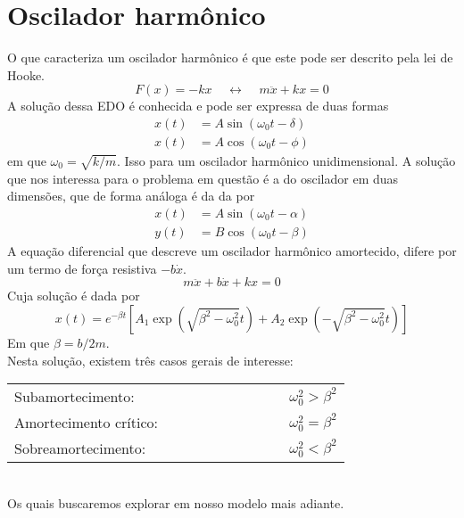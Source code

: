 \documentclass[12pt]{article}
\begin{document}
    \section*{Oscilador harmônico}
    O que caracteriza um oscilador harmônico é que este pode ser descrito pela lei de Hooke.
    \begin{equation*}
        F(x) = -kx\;\;\;\;\leftrightarrow\;\;\;\;m\ddot{x} + kx=0
    \end{equation*}
    A solução dessa EDO é conhecida e pode ser expressa de duas formas
    \begin{equation*}
        \begin{aligned}
            x(t)&=A\sin(\omega_0t-\delta)\\
            x(t)&=A\cos(\omega_0t-\phi)
        \end{aligned}
    \end{equation*}
    em que $\omega_0=\sqrt{k/m}$. Isso para um oscilador harmônico unidimensional. A solução que nos interessa
    para o problema em questão é a do oscilador em duas dimensões, que de forma análoga é da da por
    \begin{equation*}
        \begin{aligned}
            x(t)&=A\sin(\omega_0t-\alpha)\\
            y(t)&=B\cos(\omega_0t-\beta)
        \end{aligned}
    \end{equation*}
    A equação diferencial que descreve um oscilador harmônico amortecido, difere por um termo de força resistiva
    $-b\dot{x}$.
    \begin{equation*}
            m\ddot{x}+b\dot{x}+kx=0
    \end{equation*}
    Cuja solução é dada por
    \begin{equation*}
        x(t)=e^{-\beta t}\left[A_1\exp\left(\sqrt{\beta^2-\omega_0^2}t\right)+A_2\exp\left(-\sqrt{\beta^2-\omega_0^2}t\right)\right]
    \end{equation*}
    Em que $\beta=b/2m$.
    \\Nesta solução, existem três casos gerais de interesse:
    \begin{table}[h]
        \begin{tabular}{llc}
        Subamortecimento:      & $\;\;\;\;\;\;\;\;\;\;\;\;\;\;\;\;\;\;\;\;\;\;\;\;\;\;$ & $\omega_0^2>\beta^2$ \\
        Amortecimento crítico: & $\;\;\;\;\;\;\;\;\;\;\;\;\;\;\;\;\;\;\;\;\;\;\;\;\;\;$ & $\omega_0^2=\beta^2$ \\
        Sobreamortecimento:    & $\;\;\;\;\;\;\;\;\;\;\;\;\;\;\;\;\;\;\;\;\;\;\;\;\;\;$ & $\omega_0^2<\beta^2$
        \end{tabular}
        \end{table}\\
    Os quais buscaremos explorar em nosso modelo mais adiante.
\end{document}

